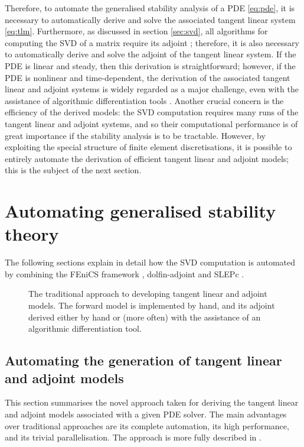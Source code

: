 \documentclass{siamltex}
\begin{document}
Therefore, to automate the generalised stability analysis of a PDE \eqref{eq:pde}, it is necessary to automatically derive and solve
the associated tangent linear system \eqref{eq:tlm}. Furthermore, as discussed in section \ref{sec:svd}, all algorithms for computing
the SVD of a matrix  require its adjoint ; therefore, it is also necessary to automatically derive and solve the adjoint
of the tangent linear system. If the PDE is linear and steady, then this derivation is straightforward; however, if the PDE
is nonlinear and time-dependent, the derivation of the associated tangent linear and adjoint systems is widely regarded as a major
challenge, even with the assistance of algorithmic differentiation tools \cite{naumann2011}. Another crucial concern is the efficiency
of the derived models: the SVD computation requires many runs of the tangent linear and adjoint systems, and so their computational
performance is of great importance if the stability analysis is to be tractable. However, by exploiting the special structure of
finite element discretisations, it is possible to entirely automate the derivation of efficient tangent linear and adjoint models; this
is the subject of the next section.

\section{Automating generalised stability theory} \label{sec:automation}
The following sections explain in detail how the SVD computation is automated by combining the FEniCS framework \cite{logg2011}, dolfin-adjoint and SLEPc \cite{hernandez2005,hernandez2007b}.

\begin{figure}

  \caption{The traditional approach to developing tangent linear and adjoint models. The forward model
  is implemented by hand, and its adjoint derived either by hand or (more often) with the assistance
  of an algorithmic differentiation tool.}
  \label{fig:traditional_approach}
\end{figure}

\subsection{Automating the generation of tangent linear and adjoint models} \label{sec:adjoints}
This section summarises the novel approach taken for deriving the tangent linear and adjoint models associated with a given
PDE solver. The main advantages over traditional approaches are its complete automation, its high performance, and its
trivial parallelisation. The approach is more fully described in \cite{farrell2012b}.
\end{document}

